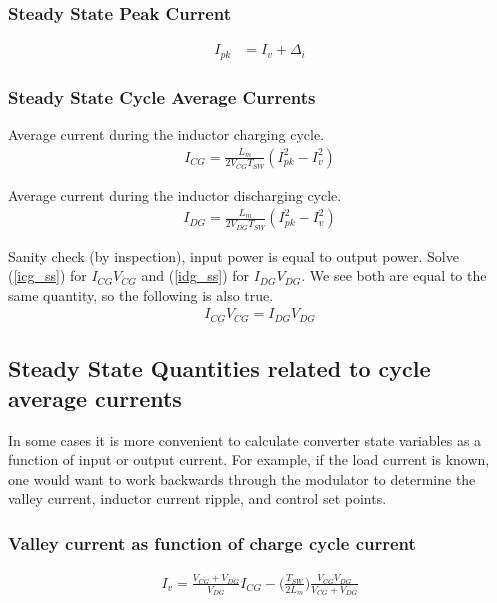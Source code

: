 \documentclass{scrartcl}
\begin{document}
		\subsubsection{Steady State Peak Current}
			\begin{align}
			I_{pk} &=  I_v + \Delta_i \label{ripple}
			\end{align}	
		
		\subsubsection{Steady State Cycle Average Currents}
			Average current during the inductor charging cycle.
			\begin{align}
			I_{CG} = \frac{L_m}{2V_{CG}T_{SW}} (I_{pk}^2 - I_v^2) \label{icg_ss}
			\end{align}	
			
			Average current during the inductor discharging cycle.
			\begin{align}
			I_{DG} = \frac{L_m}{2V_{DG}T_{SW}} (I_{pk}^2 - I_v^2) \label{idg_ss}
			\end{align}	
			
			Sanity check (by inspection), input power is equal to output power. Solve (\ref{icg_ss}) for $I_{CG}V_{CG}$ and (\ref{idg_ss}) for $I_{DG}V_{DG}$.  We see both are equal to the same quantity, so the following is also true.
			\begin{align}
			I_{CG}V_{CG} = I_{DG}V_{DG}  
			\end{align}	
	
	\subsection{Steady State Quantities related to cycle average currents}	
	In some cases it is more convenient to calculate converter state variables as a function of input or output current.  For example, if the load current is known, one would want to work backwards through the modulator to determine the valley current, inductor current ripple, and control set points.
	
		\subsubsection{Valley current as function of charge cycle current}
			\begin{align}
			I_{v} = \frac{V_{CG} + V_{DG}}{V_{DG}} I_{CG} - \bigg(\frac{T_{SW}}{2L_m}\bigg)\frac{V_{CG}V_{DG}}{V_{CG} + V_{DG}} 
			\end{align}	
			
\end{document}
